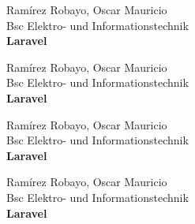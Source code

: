 \documentclass{book}
\begin{document}
\thispagestyle{empty}
\begin{flushright}Ramírez Robayo, Oscar Mauricio\\Bsc Elektro- und Informationstechnik\\\textbf{Laravel}\end{flushright}\noindent\makebox[\linewidth]{\rule{\paperwidth}{0.4pt}}
\clearpage
\thispagestyle{empty}
\begin{flushright}Ramírez Robayo, Oscar Mauricio\\Bsc Elektro- und Informationstechnik\\\textbf{Laravel}\end{flushright}\noindent\makebox[\linewidth]{\rule{\paperwidth}{0.4pt}}
\clearpage
\thispagestyle{empty}
\begin{flushright}Ramírez Robayo, Oscar Mauricio\\Bsc Elektro- und Informationstechnik\\\textbf{Laravel}\end{flushright}\noindent\makebox[\linewidth]{\rule{\paperwidth}{0.4pt}}\clearpage
\thispagestyle{empty}
\begin{flushright}Ramírez Robayo, Oscar Mauricio\\Bsc Elektro- und Informationstechnik\\\textbf{Laravel}\end{flushright}\noindent\makebox[\linewidth]{\rule{\paperwidth}{0.4pt}}
\end{document}
